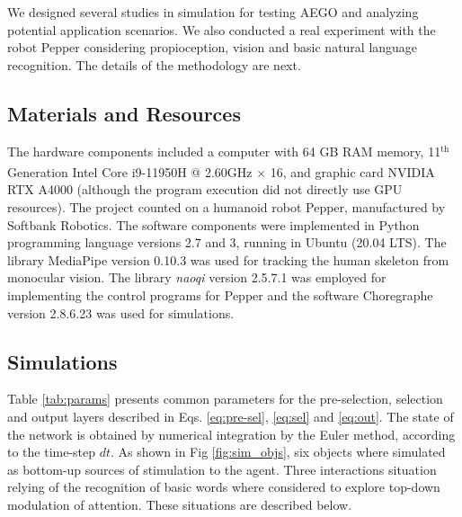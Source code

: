 \documentclass[letterpaper, 10 pt, conference]{ieeeconf}  %
\begin{document}
	We designed several studies in simulation for testing AEGO and analyzing potential application scenarios. We also conducted a real experiment with the robot Pepper considering propioception, vision and basic natural language recognition. The details of the methodology are next.

	\subsection{Materials and Resources}
	
	The hardware components included a computer with 64 GB RAM memory, 11${}^\mathrm{th}$ Generation Intel\textsuperscript{\textregistered} Core\textsuperscript{\texttrademark} i9-11950H @ 2.60GHz × 16, and graphic card NVIDIA RTX A4000 (although the program execution did not directly use GPU resources). The project counted on a humanoid robot Pepper, manufactured by Softbank Robotics. The software components were implemented in Python programming language versions 2.7 and 3, running in Ubuntu (20.04 LTS). The library MediaPipe version 0.10.3 was used for tracking the human skeleton from monocular vision. The library \textit{naoqi} version 2.5.7.1 was employed for implementing the control programs  for Pepper and the software Choregraphe version 2.8.6.23 was used for simulations. 
	
	\subsection{Simulations}
	
	Table \ref{tab:params} presents common parameters for the pre-selection, selection and output layers described in Eqs. \eqref{eq:pre-sel}, \eqref{eq:sel} and \eqref{eq:out}. The state of the network is obtained by numerical integration by the Euler method, according to the time-step $dt$. As shown in Fig \ref{fig:sim_objs}, six objects where simulated as bottom-up sources of stimulation to the agent. Three interactions situation relying of the recognition of basic words where considered to explore top-down modulation of attention. These situations are described below.
	
	\renewcommand{\arraystretch}{1.2} %
	
\end{document}
